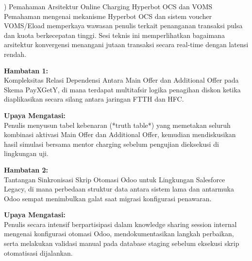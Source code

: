 \documentclass[12pt,a4paper]{article}
\begin{document}
\vspace{0.2cm}
) Pemahaman Arsitektur Online Charging Hyperbot OCS dan VOMS\\
Pemahaman mengenai mekanisme Hyperbot OCS dan sistem voucher VOMS/Eload memperkaya wawasan penulis terkait penanganan transaksi pulsa dan kuota berkecepatan tinggi. Sesi teknis ini memperlihatkan bagaimana arsitektur konvergensi menangani jutaan transaksi secara real-time dengan latensi rendah.

\clearpage
{}
\vspace{0.1cm}
\noindent\textbf{Hambatan 1:}\\
Kompleksitas Relasi Dependensi Antara Main Offer dan Additional Offer pada Skema PayXGetY, di mana terdapat multitafsir logika penagihan diskon ketika diaplikasikan secara silang antara jaringan FTTH dan HFC.\par
\vspace{0.1cm}
\noindent\textbf{Upaya Mengatasi:}\\
Penulis menyusun tabel kebenaran (*truth table*) yang memetakan seluruh kombinasi aktivasi Main Offer dan Additional Offer, kemudian mendiskusikan hasil simulasi bersama mentor charging sebelum pengujian dieksekusi di lingkungan uji.

\vspace{0.3cm}
\noindent\textbf{Hambatan 2:}\\
Tantangan Sinkronisasi Skrip Otomasi Odoo untuk Lingkungan Salesforce Legacy, di mana perbedaan struktur data antara sistem lama dan antarmuka Odoo sempat menimbulkan galat saat migrasi konfigurasi penawaran.\par
\vspace{0.1cm}
\noindent\textbf{Upaya Mengatasi:}\\
Penulis secara intensif berpartisipasi dalam knowledge sharing session internal mengenai konfigurasi otomasi Odoo, mendokumentasikan langkah perbaikan, serta melakukan validasi manual pada database staging sebelum eksekusi skrip otomatisasi dijalankan.
\end{document}
